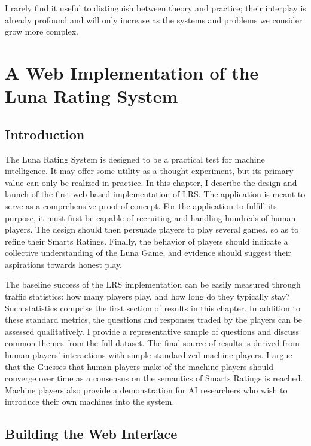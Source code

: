 \begin{savequote}[75mm]
I rarely find it useful to distinguish between theory and practice; their interplay is already profound and will only increase as the systems and problems we consider grow more complex.
\end{savequote}

\chapter{A Web Implementation of the Luna Rating System}

\section{Introduction}

The Luna Rating System is designed to be a practical test for machine intelligence. It may offer some utility as a thought experiment, but its primary value can only be realized in practice. In this chapter, I describe the design and launch of the first web-based implementation of LRS. The application is meant to serve as a comprehensive proof-of-concept. For the application to fulfill its purpose, it must first be capable of recruiting and handling hundreds of human players. The design should then persuade players to play several games, so as to refine their Smarts Ratings. Finally, the behavior of players should indicate a collective understanding of the Luna Game, and evidence should suggest their aspirations towards honest play.

The baseline success of the LRS implementation can be easily measured through traffic statistics: how many players play, and how long do they typically stay? Such statistics comprise the first section of results in this chapter. In addition to these standard metrics, the questions and responses traded by the players can be assessed qualitatively. I provide a representative sample of questions and discuss common themes from the full dataset. The final source of results is derived from human players' interactions with simple standardized machine players. I argue that the Guesses that human players make of the machine players should converge over time as a consensus on the semantics of Smarts Ratings is reached. Machine players also provide a demonstration for AI researchers who wish to introduce their own machines into the system.

\section{Building the Web Interface}


